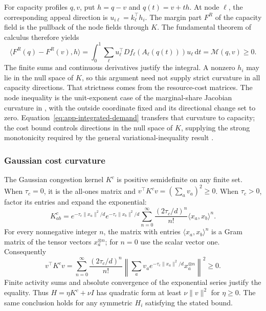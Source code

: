 For capacity profiles $q,v$, put $h=q-v$ and $q(t)=v+th$.
At node $\ell$, the corresponding appeal direction is
$u_{i\ell}=k_\ell^\top h_i$.
The margin part $F^R$ of the capacity field is the pullback of the
node fields through $K$.
The fundamental theorem of calculus therefore yields
\begin{equation}\label{eq:app-integrated-demand}
  \langle F^R(q)-F^R(v),h\rangle
  =\int_0^1\sum_\ell u_\ell^\top Df_\ell(A_\ell(q(t)))u_\ell\,\mathrm dt
  =\mathcal M(q,v)\geq0.
\end{equation}
The finite sums and continuous derivatives justify the integral.
A nonzero $h_i$ may lie in the null space of $K$, so this argument
need not supply
strict curvature in all capacity directions.
That strictness comes from the resource-cost matrices.
The node inequality is the unit-exponent case of the marginal-share Jacobian
curvature in \citet[Lemma~A.4]{ewerhart_quartieri_contests_2020}, with the
outside coordinate fixed and its directional change set to zero.
Equation~\eqref{eq:app-integrated-demand} transfers that curvature to capacity;
the cost bound controls directions in the null space of $K$, supplying the
strong monotonicity required by the general variational-inequality result
\citep{parise_ozdaglar_network_games_2019}.

\subsubsection{Gaussian cost curvature}

The Gaussian congestion kernel $K^c$ is positive semidefinite on any finite
set.
When $\tau_c=0$, it is the all-ones matrix and
$v^\top K^c v=(\sum_a v_a)^2\geq0$.
When $\tau_c>0$, factor its entries and expand the exponential:
\begin{equation}\label{eq:app-gaussian-series}
  K^c_{ab}=e^{-\tau_c\|x_a\|^2/d}e^{-\tau_c\|x_b\|^2/d}
  \sum_{n=0}^{\infty}\frac{(2\tau_c/d)^n}{n!}\langle x_a,x_b\rangle^n.
\end{equation}
For every nonnegative integer $n$, the matrix with entries
$\langle x_a,x_b\rangle^n$ is a Gram matrix of the tensor vectors
$x_a^{\otimes n}$;
for $n=0$ use the scalar vector one.
Consequently
\begin{equation}\label{eq:app-gaussian-psd}
  v^\top K^c v=\sum_{n=0}^{\infty}\frac{(2\tau_c/d)^n}{n!}
  \left\|\sum_a v_a e^{-\tau_c\|x_a\|^2/d}x_a^{\otimes n}\right\|^2\geq0.
\end{equation}
Finite activity sums and absolute convergence of the exponential
series justify the equality.
Thus $H=\eta K^c+\nu I$ has quadratic form at least $\nu\|v\|^2$ for $\eta\geq0$.
The same conclusion holds for any symmetric $H_i$ satisfying the stated bound.

